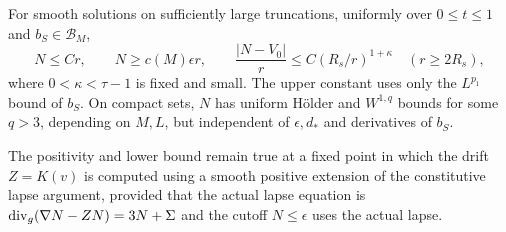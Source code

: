\begin{lemma}\label{lem:ah-lapse}
For smooth solutions on sufficiently large truncations, uniformly
over \(0\le t\le1\) and \(b_S\in\mathcal B_M\),
\begin{equation}\label{eq:ah-lapse-bounds}
 N\le Cr,\qquad N\ge c(M)\epsilon r,\qquad
 \frac{|N-V_0|}{r}\le
 C(R_s/r)^{1+\kappa}\quad(r\ge2R_s),
\end{equation}
where \(0<\kappa<\tau-1\) is fixed and small.  The upper constant
uses only the \(L^{p_1}\) bound of \(b_S\).  On compact sets,
\(N\) has uniform Hölder and \(W^{1,q}\) bounds for some \(q>3\),
depending on \(M,L\), but independent of \(\epsilon,d_*\) and
derivatives of \(b_S\).

The positivity and lower bound remain true at a fixed point in
which the drift \(Z=K(v)\) is computed using a smooth positive
extension of the constitutive lapse argument, provided that the
actual lapse equation is
\(\operatorname{div}_g(\nabla N-ZN)=3N+\Sigma\) and the cutoff
\(N\le\epsilon\) uses the actual lapse.
\end{lemma}

